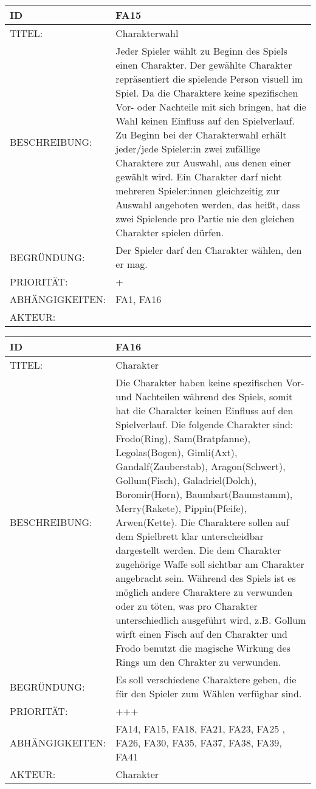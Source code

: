 \documentclass{uulm-assignment}
\begin{document}
    \begin{tabularx}{\textwidth}{|l|X |} \hline
        \textbf{ID} & \textbf{FA15} \\
        \hline
        TITEL: &  Charakterwahl\\
        \hline
        BESCHREIBUNG: & Jeder Spieler wählt zu Beginn des Spiels einen Charakter. Der gewählte Charakter repräsentiert die spielende Person visuell im Spiel. Da die Charaktere keine spezifischen Vor- oder Nachteile mit sich bringen, hat die Wahl keinen Einfluss auf den Spielverlauf. Zu Beginn bei der Charakterwahl erhält jeder/jede Spieler:in zwei zufällige Charaktere zur Auswahl, aus denen einer gewählt wird. Ein Charakter darf nicht mehreren Spieler:innen gleichzeitig zur Auswahl angeboten werden, das heißt, dass zwei Spielende pro Partie nie den gleichen Charakter spielen dürfen.
        \\
        \hline
        BEGRÜNDUNG: &  Der Spieler darf den Charakter wählen, den er mag.\\
        \hline
        PRIORITÄT: & +\\
        \hline
        ABHÄNGIGKEITEN: & FA1, FA16\\
        \hline
        AKTEUR: & \\
        \hline
    \end{tabularx}
    
    \begin{tabularx}{\textwidth}{|l|X |} \hline
        \textbf{ID} & \textbf{FA16} \\
        \hline
        TITEL: &  Charakter\\
        \hline
        BESCHREIBUNG: & Die Charakter haben keine spezifischen Vor- und Nachteilen während des Spiels, somit hat die Charakter keinen Einfluss auf den Spielverlauf. Die folgende Charakter sind: Frodo(Ring), Sam(Bratpfanne), Legolas(Bogen), Gimli(Axt), Gandalf(Zauberstab), Aragon(Schwert), Gollum(Fisch), Galadriel(Dolch), Boromir(Horn), Baumbart(Baumstamm), Merry(Rakete), Pippin(Pfeife), Arwen(Kette).
\newline  
Die Charaktere sollen auf dem Spielbrett klar unterscheidbar dargestellt werden. Die dem Charakter zugehörige Waffe soll sichtbar am Charakter angebracht sein. Während des Spiels ist es möglich andere Charaktere zu verwunden oder zu töten, was pro Charakter unterschiedlich ausgeführt wird, z.B. Gollum wirft einen Fisch auf den Charakter und Frodo benutzt die magische Wirkung des Rings um den Chrakter zu verwunden.
        \\
        \hline
        BEGRÜNDUNG: & Es soll verschiedene Charaktere geben, die für den Spieler zum Wählen verfügbar sind. \\
        \hline
        PRIORITÄT: & +++\\
        \hline
        ABHÄNGIGKEITEN: & FA14, FA15, FA18, FA21, FA23, FA25 , FA26, FA30, FA35, FA37, FA38, FA39, FA41\\
        \hline
        AKTEUR: & Charakter\\
        \hline
    \end{tabularx}
    
\end{document}
